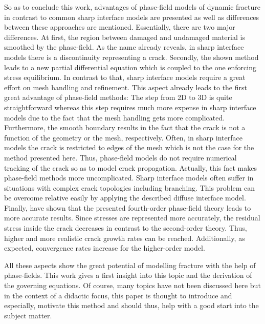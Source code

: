 So as to conclude this work, advantages of phase-field models of dynamic fracture in contrast to common sharp interface models are presented as well as differences between these approaches are mentioned. Essentially, there are two major differences. At first, the region between damaged and undamaged material is smoothed by the phase-field. As the name already reveals, in sharp interface models there is a discontinuity representing a crack. Secondly, the shown method leads to a new partial differential equation which is coupled to the one enforcing stress equilibrium. In contrast to that, sharp interface models require a great effort on mesh handling and refinement. This aspect already leads to the first great advantage of phase-field methods: The step from 2D to 3D is quite straightforward whereas this step requires much more expense in sharp interface models due to the fact that the mesh handling gets more complicated. Furthermore, the smooth boundary results in the fact that the crack is not a function of the geometry or the mesh, respectively. Often, in sharp interface models the crack is restricted to edges of the mesh which is not the case for the method presented here. Thus, phase-field models do not require numerical tracking of the crack so as to model crack propagation. Actually, this fact makes phase-field methods more uncomplicated. Sharp interface models often suffer in situations with complex crack topologies including branching. This problem can be overcome relative easily by applying the described diffuse interface model. Finally, \citet{02_PF_HO_brittle} have shown that the presented fourth-order phase-field theory leads to more accurate results. Since stresses are represented more accurately, the residual stress inside the crack decreases in contrast to the second-order theory. Thus, higher and more realistic crack growth rates can be reached. Additionally, as expected, convergence rates increase for the higher-order model.

All these aspects show the great potential of modelling fracture with the help of phase-fields. This work gives a first insight into this topic and the derivation of the governing equations. Of course, many topics have not been discussed here but in the context of a didactic focus, this paper is thought to introduce and especially, motivate this method and should thus, help with a good start into the subject matter.

